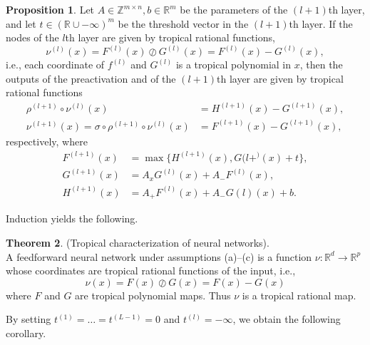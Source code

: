 \documentclass{article}
\theoremstyle{definition}
\newtheorem{theorem}{Theorem}[section]
\newtheorem{proposition}[theorem]{Proposition}
\newtheorem{comment}[theorem]{Comment}
\begin{document}
\begin{proposition}
Let $A \in \mathbb{Z}^{m \times n}, b \in \mathbb{R}^{m}$ be the parameters of the $(l+1)$th layer, and let $t \in (\mathbb{R} \cup {- \infty})^{m}$ be the threshold vector in the $(l+1)$th layer. If the nodes of the $l$th
layer are given by tropical rational functions,
$$ \nu^{(l)}(x) = F^{(l)}(x) \oslash G^{(l)}(x) = F^{(l)}(x)-G^{(l)}(x),$$
i.e., each coordinate of $f^{(l)}$ and $G^{(l)}$ is a tropical polynomial in $x$, then the outputs of the preactivation and of the $(l+1)$th layer are given by tropical rational functions
\begin{align*}
\rho^{(l+1)} \circ \nu^{(l)}(x) &= H^{(l+1)}(x) - G^{(l+1)}(x), \\
\nu^{(l+1)}(x) = \sigma \circ \rho^{(l+1)} \circ \nu^{(l)}(x) &= F^{(l+1)}(x) - G^{(l+1)}(x),
\end{align*}
respectively, where
\begin{align*}
F^{(l+1)}(x) &= \max \{ H^{(l+1)}(x), G{(l+^)}(x) +t \}, \\
G^{(l+1)}(x) &= A_{x}G^{(l)}(x) + A_{-}F^{(l)}(x), \\
H^{(l+1)}(x) &= A_{+}F^{(l)}(x) + A_{-}G{(l)}(x) +b.
\end{align*}
\end{proposition}

Induction yields the following.

\begin{theorem}
(Tropical characterization of neural networks). \\
A feedforward neural network under assumptions (a)–(c)
is a function $\nu : \mathbb{R}^{d} \to \mathbb{R}^{p}$ whose coordinates are tropical rational functions of the input, i.e.,
$$ \nu(x) = F(x) \oslash G(x) = F(x) - G(x) $$
where $F$ and $G$ are tropical polynomial maps. Thus $\nu$ is a tropical rational map.
\end{theorem}

By setting $t^{(1)} = \dots = t^{(L-1)} = 0$ and $t^{(l)} = - \infty$, we obtain the following corollary.
\end{document}
